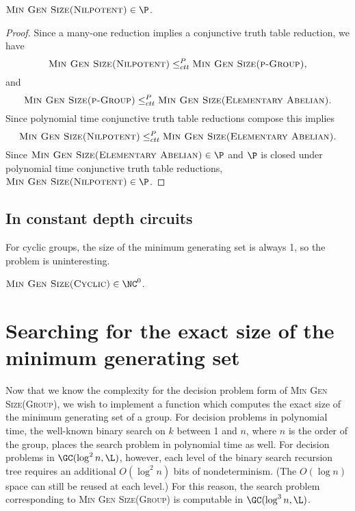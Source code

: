 \documentclass{article}
\begin{document}
\begin{theorem}
  $\textsc{Min Gen Size(Nilpotent)} \in \P$.
\end{theorem}
\begin{proof}
  Since a many-one reduction implies a conjunctive truth table reduction, we have
  \begin{equation*}
    \textsc{Min Gen Size(Nilpotent)} \leq_{ctt}^P \textsc{Min Gen Size(p-Group)},
  \end{equation*}
  and
  \begin{equation*}
    \textsc{Min Gen Size(p-Group)} \leq_{ctt}^P \textsc{Min Gen Size(Elementary Abelian)}.
  \end{equation*}
  Since polynomial time conjunctive truth table reductions compose this implies
  \begin{equation*}
    \textsc{Min Gen Size(Nilpotent)} \leq_{ctt}^P \textsc{Min Gen Size(Elementary Abelian)}.
  \end{equation*}
  Since $\textsc{Min Gen Size(Elementary Abelian)} \in \P$ and $\P$ is closed under polynomial time conjunctive truth table reductions, $\textsc{Min Gen Size(Nilpotent)} \in \P$.
\end{proof}

\subsection{In constant depth circuits}

For cyclic groups, the size of the minimum generating set is always 1, so the problem is uninteresting.

\begin{theorem}
  $\textsc{Min Gen Size(Cyclic)} \in \NC^0$.
\end{theorem}

\section{Searching for the exact size of the minimum generating set}

Now that we know the complexity for the decision problem form of \textsc{Min Gen Size(Group)}, we wish to implement a function which computes the exact size of the minimum generating set of a group.
For decision problems in polynomial time, the well-known binary search on $k$ between 1 and $n$, where $n$ is the order of the group, places the search problem in polynomial time as well.
For decision problems in $\GC(\log^2 n, \L)$, however, each level of the binary search recursion tree requires an additional $O(\log^2 n)$ bits of nondeterminism.
(The $O(\log n)$ space can still be reused at each level.)
For this reason, the search problem corresponding to \textsc{Min Gen Size(Group)} is computable in $\GC(\log^3 n, \L)$.
\end{document}
